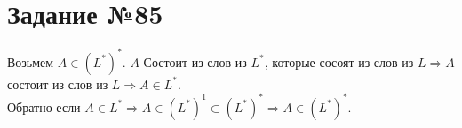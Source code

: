 \documentclass[12pt]{article}
\begin{document}
\section{Задание №85}
Возьмем $A \in (L^{*})^{*}$. $A$ Состоит из слов из $L^{*}$, которые сосоят из
слов из $L \Rightarrow A$ состоит из слов из $L \Rightarrow A \in L^{*}$. \\
Обратно если
$A \in L^{*} \Rightarrow A \in (L^{*})^{1} \subset (L^{*})^{*} \Rightarrow A \in (L^{*})^{*}$.
\end{document}
